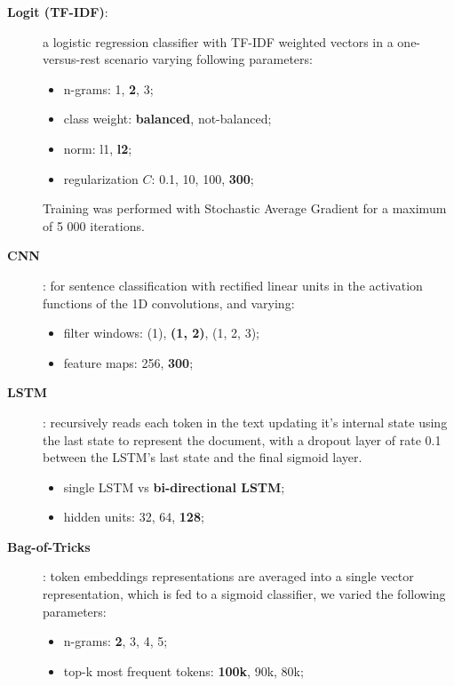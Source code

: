 \documentclass[11pt,a4paper]{article}
\begin{document}
\begin{description}

\item[\textbf{Logit (TF-IDF)}:] a logistic regression classifier with TF-IDF
weighted vectors in a one-versus-rest scenario varying following parameters:

\begin{itemize}
\item n-grams: 1, \textbf{2}, 3;
\item class weight: \textbf{balanced}, not-balanced;
\item norm: l1, \textbf{l2};
\item regularization $C$: 0.1, 10, 100, \textbf{300};
\end{itemize}

Training was performed with Stochastic Average Gradient for a maximum of 5 000 iterations.

\item[\textbf{CNN}]\cite{kim-2014-convolutional}: for sentence classification
with rectified linear units in the activation functions of the 1D convolutions,
and varying:

\begin{itemize}
\item filter windows: (1), \textbf{(1, 2)}, (1, 2, 3);
\item feature maps: 256, \textbf{300};
\end{itemize}

\item[\textbf{LSTM}]\cite{Hochreiter:1997:LSM:1246443.1246450}: recursively reads
each token in the text updating it's internal state using the last state to
represent the document, with a dropout layer of rate 0.1 between the LSTM's last
state and the final sigmoid layer.

\begin{itemize}
\item single LSTM vs \textbf{bi-directional LSTM};
\item hidden units: 32, 64, \textbf{128};
\end{itemize}

\item[\textbf{Bag-of-Tricks}]\cite{joulin-etal-2017-bag}: token embeddings
representations are averaged into a single vector representation, which is fed
to a sigmoid classifier, we varied the following parameters:

\begin{itemize}
\item n-grams: \textbf{2}, 3, 4, 5;
\item top-k most frequent tokens: \textbf{100k}, 90k, 80k;
\end{itemize}

\end{description}
\end{document}

